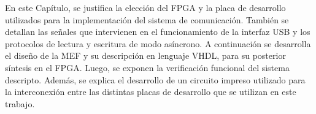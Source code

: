 
En este Capítulo, se justifica la elección del FPGA y la placa de desarrollo utilizados para la implementación del sistema de comunicación. También se detallan las señales que intervienen en el funcionamiento de la interfaz USB y los protocolos de lectura y escritura de modo asíncrono. A continuación se desarrolla el diseño de la MEF y su descripción en lenguaje VHDL, para su posterior síntesis en el FPGA. Luego, se exponen la verificación funcional del sistema descripto. Además, se explica el desarrollo de un circuito impreso utilizado para la interconexión entre las distintas placas de desarrollo que se utilizan en este trabajo.
